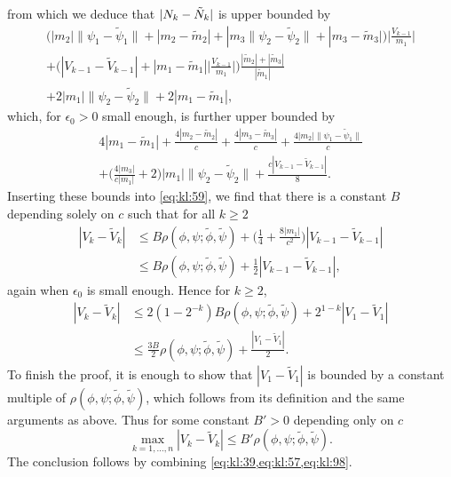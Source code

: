 \documentclass[journal]{IEEEtran}
\newcommand{\1}{\boldsymbol{1}}
\DeclarePairedDelimiter{\abs}{\lvert}{\rvert}
\begin{document}
  from which we deduce that $\abs{N_k-\tilde{N}_k}$ is upper bounded by 
\begin{multline*}
\Big(|m_2|\|\psi_1 - \tilde{\psi}_1\| + |m_2 - \tilde{m}_2|
	+ |m_3\|\psi_2 - \tilde{\psi}_2\| + |m_3 - \tilde{m}_3|
	\Big)\Big|\frac{V_{k-1}}{m_1} \Big| \\	+ \Big(|V_{k-1} - \tilde{V}_{k-1}| + |m_1 - \tilde{m}_1| \Big|\frac{V_{k-1}}{m_1} \Big| \Big)\frac{|\tilde{m}_2| + |\tilde{m}_3|}{|\tilde{m}_1|} \\
	+ 2|m_1| \|\psi_2 - \tilde{\psi}_2\| + 2|m_1 - \tilde{m}_1|, \end{multline*} 
which, for $\epsilon_0>0$ small enough, is further upper bounded by
\begin{multline*}
	 4|m_1 - \tilde{m}_1|%
	+ \frac{4|m_2 - \tilde{m}_2|}{c}%
	+ \frac{4|m_3 - \tilde{m}_3|}{c}%
	+ \frac{4|m_2|\|\psi_1 - \tilde{\psi}_1\|}{c}
	\\ + \Big(\frac{4|m_3|}{c|m_1|} + 2\Big)|m_1|\|\psi_2 - \tilde{\psi}_2\| + \frac{c|V_{k-1} - \tilde{V}_{k-1}|}{8}.
\end{multline*}
%
 Inserting these bounds into \cref{eq:kl:59}, we
  find that there is a constant $B$ depending solely on $c$ such that for all
  $k \geq 2$
  \begin{align*}
	|V_k - \tilde{V}_k|%
	&\leq B \rho(\phi,\psi;\tilde{\phi},\tilde{\psi}) + \Big(\frac{1}{4} + \frac{8|m_1|}{c^2} \Big)|V_{k-1} - \tilde{V}_{k-1}|\\
	&\leq B \rho(\phi,\psi;\tilde{\phi},\tilde{\psi}) + \frac{1}{2}|V_{k-1} - \tilde{V}_{k-1}|,
  \end{align*}
  again when $\epsilon_0$ is small enough. Hence for $k \geq 2$,
  \begin{align*}
  |V_k - \tilde{V}_k|
  &\leq 2(1 - 2^{-k})B \rho(\phi,\psi;\tilde{\phi},\tilde{\psi})%
  + 2^{1-k} |V_1 - \tilde{V}_1|\\
  &\leq \frac{3B}{2}\rho(\phi,\psi;\tilde{\phi},\tilde{\psi})%
  + \frac{|V_1 - \tilde{V}_1|}{2}.
  \end{align*}
  To finish the proof, it is enough to show that $|V_1 - \tilde{V}_1|$ is bounded by a constant multiple of $\rho(\phi,\psi;\tilde{\phi},\tilde{\psi})$, which follows from its definition and the same arguments as above. Thus for some constant $B' > 0$ depending only on $c$
  \begin{equation}
    \label{eq:kl:98}
    \max_{k=1,\dots,n}|V_k - \tilde{V}_k|
    \leq B'\rho(\phi,\psi;\tilde{\phi},\tilde{\psi}).%
  \end{equation}
  The conclusion follows by combining \cref{eq:kl:39,eq:kl:57,eq:kl:98}.
\end{document}
